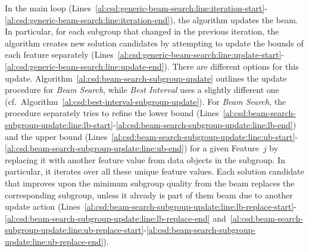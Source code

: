 \documentclass{article}
\theoremstyle{definition}
\begin{document}
In the main loop (Lines~\ref{al:csd:generic-beam-search:line:iteration-start}-\ref{al:csd:generic-beam-search:line:iteration-end}), the algorithm updates the beam.
In particular, for each subgroup that changed in the previous iteration, the algorithm creates new solution candidates by attempting to update the bounds of each feature separately (Lines~\ref{al:csd:generic-beam-search:line:update-start}-\ref{al:csd:generic-beam-search:line:update-end}).
There are different options for this update.
Algorithm~\ref{al:csd:beam-search-subgroup-update} outlines the update procedure for \emph{Beam Search}, while \emph{Best Interval} uses a slightly different one (cf.~Algorithm~\ref{al:csd:best-interval-subgroup-update}).
For \emph{Beam Search}, the procedure separately tries to refine the lower bound (Lines~\ref{al:csd:beam-search-subgroup-update:line:lb-start}-\ref{al:csd:beam-search-subgroup-update:line:lb-end}) and the upper bound (Lines~\ref{al:csd:beam-search-subgroup-update:line:ub-start}-\ref{al:csd:beam-search-subgroup-update:line:ub-end}) for a given Feature~$j$ by replacing it with another feature value from data objects in the subgroup.
In particular, it iterates over all these unique feature values.
Each solution candidate that improves upon the minimum subgroup quality from the beam replaces the corresponding subgroup, unless it already is part of them beam due to another update action (Lines~\ref{al:csd:beam-search-subgroup-update:line:lb-replace-start}-\ref{al:csd:beam-search-subgroup-update:line:lb-replace-end} and~\ref{al:csd:beam-search-subgroup-update:line:ub-replace-start}-\ref{al:csd:beam-search-subgroup-update:line:ub-replace-end}).
\end{document}
